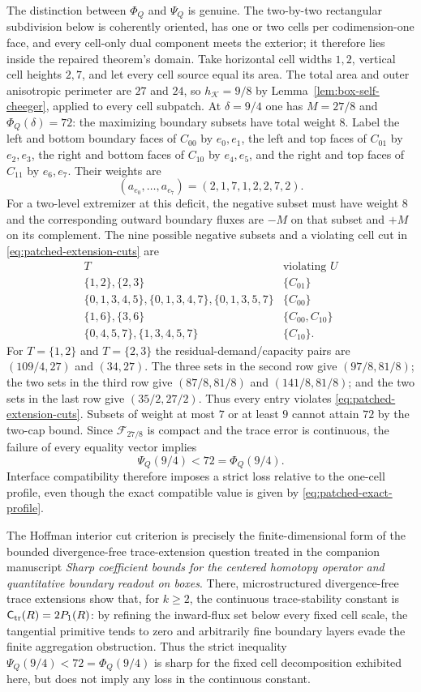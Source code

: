 The distinction between $\Phi_Q$ and $\Psi_Q$ is genuine. The two-by-two
rectangular subdivision below is coherently oriented, has one or two cells per
codimension-one face, and every cell-only dual component meets the exterior;
it therefore lies inside the repaired theorem's domain. Take horizontal cell
widths
$1,2$, vertical cell heights $2,7$, and let every cell source equal its area.
The total area and outer anisotropic perimeter are $27$ and $24$, so
$h_{\mathcal K}=9/8$ by Lemma~\ref{lem:box-self-cheeger}, applied to every
cell subpatch.  At $\delta=9/4$ one has $M=27/8$ and
$\Phi_Q(\delta)=72$: the maximizing boundary subsets have total weight $8$.
Label the left and bottom boundary faces of $C_{00}$ by $e_0,e_1$, the left
and top faces of $C_{01}$ by $e_2,e_3$, the right and bottom faces of
$C_{10}$ by $e_4,e_5$, and the right and top faces of $C_{11}$ by $e_6,e_7$.
Their weights are
\[
(a_{e_0},\ldots,a_{e_7})=(2,1,7,1,2,2,7,2).
\]
For a two-level extremizer at this deficit, the negative subset must have
weight $8$ and the corresponding outward boundary fluxes are $-M$ on that
subset and $+M$ on its complement.  The nine possible negative subsets and a
violating cell cut in \eqref{eq:patched-extension-cuts} are
\[
\begin{array}{c|c}
T & \text{violating }U\\ \hline
\{1,2\},\{2,3\}&\{C_{01}\}\\
\{0,1,3,4,5\},\{0,1,3,4,7\},\{0,1,3,5,7\}&\{C_{00}\}\\
\{1,6\},\{3,6\}&\{C_{00},C_{10}\}\\
\{0,4,5,7\},\{1,3,4,5,7\}&\{C_{10}\}.
\end{array}
\]
For $T=\{1,2\}$ and $T=\{2,3\}$ the residual-demand/capacity pairs are
$(109/4,27)$ and $(34,27)$.  The three sets in the second row give
$(97/8,81/8)$; the two sets in the third row give $(87/8,81/8)$ and
$(141/8,81/8)$; and the two sets in the last row give $(35/2,27/2)$.
Thus every entry violates \eqref{eq:patched-extension-cuts}.  Subsets of
weight at most $7$ or at least $9$ cannot attain
$72$ by the two-cap bound.  Since $\mathcal F_{27/8}$ is compact and the trace
error is continuous, the failure of every equality vector implies
\[
 \Psi_Q(9/4)<72=\Phi_Q(9/4).
\]
Interface compatibility therefore imposes a strict loss relative to the
one-cell profile, even though the exact compatible value is given by
\eqref{eq:patched-exact-profile}.

The Hoffman interior cut criterion is precisely the finite-dimensional form of
the bounded divergence-free trace-extension question treated in the companion
manuscript \emph{Sharp coefficient bounds for the centered homotopy operator
and quantitative boundary readout on boxes}.  There, microstructured
divergence-free trace extensions show that, for $k\ge2$, the continuous
trace-stability constant is $\mathsf C_{\rm tr}(R)=2P_1(R)$: by refining the
inward-flux set below every fixed cell scale, the tangential primitive tends to
zero and arbitrarily fine boundary layers evade the finite aggregation
obstruction.  Thus the strict inequality
$\Psi_Q(9/4)<72=\Phi_Q(9/4)$ is sharp for the fixed cell decomposition
exhibited here, but does not imply any loss in the continuous constant.
